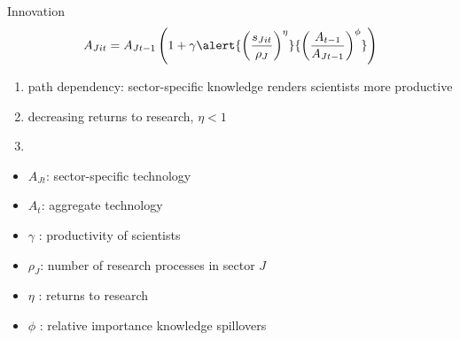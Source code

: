 \documentclass[11pt,aspectratio=169]{beamer}
\begin{document}
\addtocounter{framenumber}{-1}
\begin{frame}{Innovation}
\large
\begin{align*}
	A_{Jit}={A_{Jt-1}}\left(1+\gamma\alert{\left(\frac{s_{Jit}}{\rho_J}\right)^{\eta}}{\left(\frac{A_{t-1}}{A_{Jt-1}}\right)^\phi}\right)
\end{align*}
\normalsize
\begin{enumerate}
	\item path dependency: sector-specific knowledge renders scientists more productive
	\item \alert{decreasing returns to research, $\eta<1$}
	\item[] \ %
\end{enumerate}
\small
\vspace{4mm}
\hspace{-2mm}
\begin{minipage}[t!]{0.43\textwidth}
	\vspace{0mm}
	\begin{itemize}
		\item[] $A_{Jt}$: sector-specific technology
		\vspace{-2mm}		
		\item[] $A_t$: aggregate technology
		\vspace{-2mm}
		\item[] $\gamma$ : productivity of scientists
	\end{itemize}
\end{minipage}
\vspace{-5mm}
\begin{minipage}[t!]{0.55\textwidth}
	\vspace{0mm}
	\begin{itemize}	
		\item[] \alert{$\rho_J$: number of research processes in sector $J$}
		\vspace{-2mm}			
		\item[] $\eta$ : returns to research
		\vspace{-2mm}			
		\item[] $\phi$ : relative importance knowledge spillovers
	\end{itemize}
\end{minipage}
\end{frame}
\end{document}
